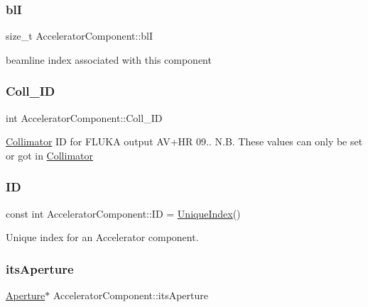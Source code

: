 \subsubsection{\texorpdfstring{blI}{blI}}
{\footnotesize\ttfamily size\+\_\+t Accelerator\+Component\+::blI\hspace{0.3cm}{\ttfamily [protected]}}

beamline index associated with this component \mbox{\label{classAcceleratorComponent_a19b829780a5667b311e760329088b9db}} 
\subsubsection{\texorpdfstring{Coll\+\_\+\+ID}{Coll\_ID}}
{\footnotesize\ttfamily int Accelerator\+Component\+::\+Coll\+\_\+\+ID\hspace{0.3cm}{\ttfamily [protected]}}

\hyperlink{classCollimator}{Collimator} ID for F\+L\+U\+KA output A\+V+\+HR 09.. N.\+B. These values can only be set or got in \hyperlink{classCollimator}{Collimator} \mbox{\label{classAcceleratorComponent_ad1c205fd2524942f308ac39e37a7d1be}} 
\subsubsection{\texorpdfstring{ID}{ID}}
{\footnotesize\ttfamily const int Accelerator\+Component\+::\+ID = \hyperlink{classAcceleratorComponent_aa7ad4d39e1a488b705983842ed1ac784}{Unique\+Index}()\hspace{0.3cm}{\ttfamily [static]}}

Unique index for an Accelerator component. \mbox{\label{classAcceleratorComponent_a776332766062c4e9342ef06d8ba0b45f}} 
\subsubsection{\texorpdfstring{its\+Aperture}{itsAperture}}
{\footnotesize\ttfamily \hyperlink{classAperture}{Aperture}$\ast$ Accelerator\+Component\+::its\+Aperture\hspace{0.3cm}{\ttfamily [protected]}}

